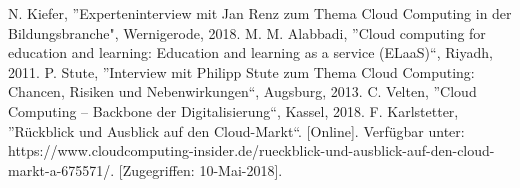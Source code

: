 \documentclass[conference]{IEEEtran}
\begin{document}
\begin{thebibliography}{00}
 N. Kiefer, ''Experteninterview mit Jan Renz zum Thema Cloud Computing in der Bildungsbranche", Wernigerode, 2018.
 M. M. Alabbadi, ''Cloud computing for education and learning: Education and learning as a service (ELaaS)“, Riyadh, 2011.
 P. Stute, ''Interview mit Philipp Stute zum Thema Cloud Computing: Chancen, Risiken und Nebenwirkungen“, Augsburg, 2013.
 C. Velten, ''Cloud Computing – Backbone der Digitalisierung“, Kassel, 2018.
 F. Karlstetter, ''Rückblick und Ausblick auf den Cloud-Markt“. [Online]. Verfügbar unter: https://www.cloudcomputing-insider.de/rueckblick-und-ausblick-auf-den-cloud-markt-a-675571/. [Zugegriffen: 10-Mai-2018].

\end{thebibliography}
\end{document}
